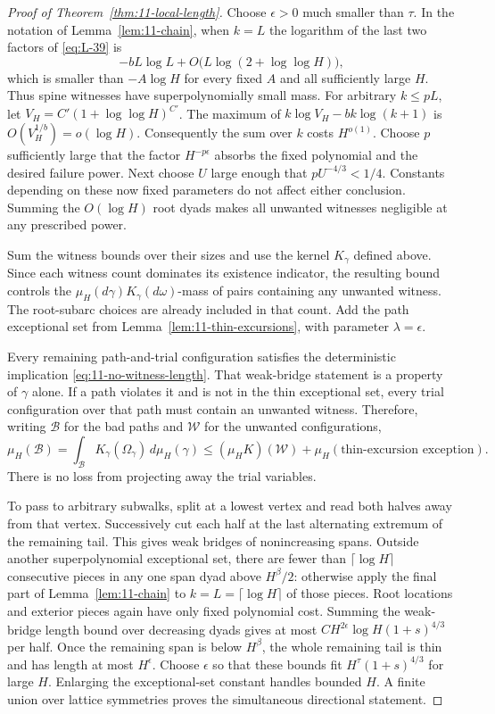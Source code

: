 \begin{proof}[Proof of Theorem~\ref{thm:11-local-length}]
Choose $\epsilon>0$ much smaller than $\tau$. In the notation of
Lemma~\ref{lem:11-chain}, when $k=L$ the logarithm of the last two
factors of \eqref{eq:L-39} is
\[
 -bL\log L+O\bigl(L\log(2+\log\log H)\bigr),
\]
which is smaller than $-A\log H$ for every fixed $A$ and all
sufficiently large $H$. Thus spine witnesses have superpolynomially
small mass. For arbitrary $k\le pL$, let
$V_H=C'(1+\log\log H)^{C'}$. The maximum of
$k\log V_H-bk\log(k+1)$ is $O(V_H^{1/b})=o(\log H)$.
Consequently the sum over $k$ costs $H^{o(1)}$. Choose $p$ sufficiently
large that the factor $H^{-p\epsilon}$ absorbs the fixed polynomial
and the desired failure power. Next choose $U$ large enough that
$pU^{-4/3}<1/4$. Constants depending on these now fixed parameters
do not affect either conclusion. Summing the $O(\log H)$ root dyads
makes all unwanted witnesses negligible at any prescribed power.

Sum the witness bounds over their sizes and use the kernel
$K_\gamma$ defined above. Since each witness count dominates its
existence indicator, the resulting bound controls the
$\mu_H(d\gamma)K_\gamma(d\omega)$-mass of pairs containing any unwanted
witness. The root-subarc choices are already included in that count.
Add the path exceptional set from
Lemma~\ref{lem:11-thin-excursions}, with parameter $\lambda=\epsilon$.

Every remaining path-and-trial configuration satisfies the
deterministic implication \eqref{eq:11-no-witness-length}.
That weak-bridge statement is a property of $\gamma$ alone.
If a path violates it and is not in the thin exceptional set, every
trial configuration over that path must contain an unwanted witness.
Therefore, writing $\mathcal B$ for the bad paths and $\mathcal W$
for the unwanted configurations,
\[
 \mu_H(\mathcal B)
 =\int_{\mathcal B}K_\gamma(\Omega_\gamma)\,d\mu_H(\gamma)
 \le (\mu_H K)(\mathcal W)
       +\mu_H(\text{thin-excursion exception}).
\]
There is no loss from projecting away the trial variables.

To pass to arbitrary subwalks, split at a lowest vertex and read both
halves away from that vertex. Successively cut each half at the last
alternating extremum of the remaining tail. This gives weak bridges
of nonincreasing spans. Outside another superpolynomial exceptional
set, there are fewer than $\lceil\log H\rceil$ consecutive pieces in
any one span dyad above $H^\beta/2$: otherwise apply the final part
of Lemma~\ref{lem:11-chain} to $k=L=\lceil\log H\rceil$ of those
pieces. Root locations and
exterior pieces again have only fixed polynomial cost. Summing the
weak-bridge length bound over decreasing dyads gives at most
$CH^{2\epsilon}\log H(1+s)^{4/3}$ per half. Once the remaining span is
below $H^\beta$, the whole remaining tail is thin and has length at
most $H^\epsilon$. Choose $\epsilon$ so that these bounds fit
$H^\tau(1+s)^{4/3}$ for large $H$. Enlarging the exceptional-set
constant handles bounded $H$. A finite union over lattice symmetries
proves the simultaneous directional statement.
\end{proof}

